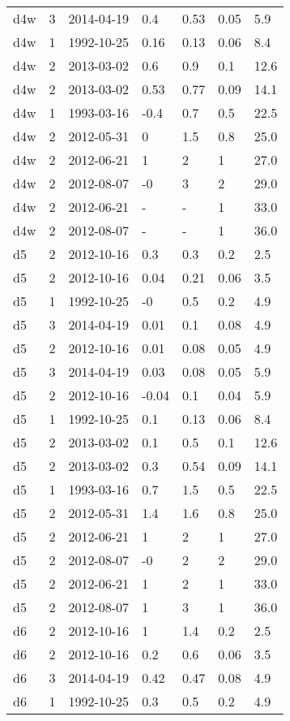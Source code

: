 \begin{table*}[htp]
\begin{tabular}{llll}
d4w & 3 & 2014-04-19 & 0.4 & 0.53 & 0.05 & 5.9 \\
d4w & 1 & 1992-10-25 & 0.16 & 0.13 & 0.06 & 8.4 \\
d4w & 2 & 2013-03-02 & 0.6 & 0.9 & 0.1 & 12.6 \\
d4w & 2 & 2013-03-02 & 0.53 & 0.77 & 0.09 & 14.1 \\
d4w & 1 & 1993-03-16 & -0.4 & 0.7 & 0.5 & 22.5 \\
d4w & 2 & 2012-05-31 & 0 & 1.5 & 0.8 & 25.0 \\
d4w & 2 & 2012-06-21 & 1 & 2 & 1 & 27.0 \\
d4w & 2 & 2012-08-07 & -0 & 3 & 2 & 29.0 \\
d4w & 2 & 2012-06-21 & - & - & 1 & 33.0 \\
d4w & 2 & 2012-08-07 & - & - & 1 & 36.0 \\
d5 & 2 & 2012-10-16 & 0.3 & 0.3 & 0.2 & 2.5 \\
d5 & 2 & 2012-10-16 & 0.04 & 0.21 & 0.06 & 3.5 \\
d5 & 1 & 1992-10-25 & -0 & 0.5 & 0.2 & 4.9 \\
d5 & 3 & 2014-04-19 & 0.01 & 0.1 & 0.08 & 4.9 \\
d5 & 2 & 2012-10-16 & 0.01 & 0.08 & 0.05 & 4.9 \\
d5 & 3 & 2014-04-19 & 0.03 & 0.08 & 0.05 & 5.9 \\
d5 & 2 & 2012-10-16 & -0.04 & 0.1 & 0.04 & 5.9 \\
d5 & 1 & 1992-10-25 & 0.1 & 0.13 & 0.06 & 8.4 \\
d5 & 2 & 2013-03-02 & 0.1 & 0.5 & 0.1 & 12.6 \\
d5 & 2 & 2013-03-02 & 0.3 & 0.54 & 0.09 & 14.1 \\
d5 & 1 & 1993-03-16 & 0.7 & 1.5 & 0.5 & 22.5 \\
d5 & 2 & 2012-05-31 & 1.4 & 1.6 & 0.8 & 25.0 \\
d5 & 2 & 2012-06-21 & 1 & 2 & 1 & 27.0 \\
d5 & 2 & 2012-08-07 & -0 & 2 & 2 & 29.0 \\
d5 & 2 & 2012-06-21 & 1 & 2 & 1 & 33.0 \\
d5 & 2 & 2012-08-07 & 1 & 3 & 1 & 36.0 \\
d6 & 2 & 2012-10-16 & 1 & 1.4 & 0.2 & 2.5 \\
d6 & 2 & 2012-10-16 & 0.2 & 0.6 & 0.06 & 3.5 \\
d6 & 3 & 2014-04-19 & 0.42 & 0.47 & 0.08 & 4.9 \\
d6 & 1 & 1992-10-25 & 0.3 & 0.5 & 0.2 & 4.9 \\

\end{tabular}
\end{table*}
